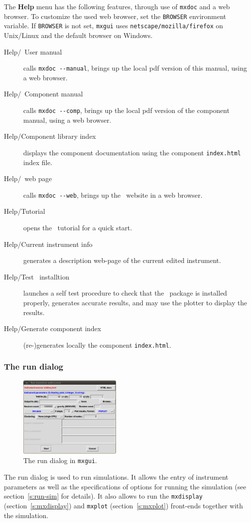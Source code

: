 \noindent The {\bfseries Help} menu has the following features, through use of
\verb+mxdoc+ and a web browser. To customize the used web browser, set
the \verb+BROWSER+ environment variable. If \verb+BROWSER+ is not set,
\verb+mxgui+ uses \verb+netscape/mozilla/firefox+ on Unix/Linux and the default browser on
Windows.
\begin{description}
\item[Help/\MCX\ User manual] calls \verb+mxdoc --manual+, brings up the local
  pdf version of this manual, using a web browser.
\item[Help/\MCX\ Component manual] calls \verb+mxdoc --comp+, brings up the local
  pdf version of the component manual, using a web browser.
\item[Help/Component library index] displays the component documentation using
  the component \verb+index.html+ index file.
\item[Help/\MCX\ web page] calls \verb+mxdoc --web+, brings up the \MCX\
  website in a web browser.
\item[Help/Tutorial] opens the \MCX\ tutorial for a quick start.
\item[Help/Current instrument info] generates a description web-page of the current edited instrument.
\item[Help/Test \MCX\ installtion] launches a self test procedure to check that the \MCX\ package is installed properly, generates accurate results, and may use the plotter to display the results.
\item[Help/Generate component index] (re-)generates locally the component \verb+index.html+.
\end{description}


\subsubsection{The run dialog}

\begin{figure}[htb!]
  \begin{center}
    \includegraphics[width=0.45\textwidth]{figures/mxgui-run.eps}
  \end{center}
\caption{The run dialog in \texttt{mxgui}.}
\label{fig:mxgui-run}
\end{figure}
%
The run dialog is used to run simulations. It allows the entry of
instrument parameters as well as the specifications of options for
running the simulation (see section~\ref{s:run-sim} for details). It
also allows to run the \verb+mxdisplay+ (section~\ref{s:mxdisplay}) and
\verb+mxplot+ (section~\ref{s:mxplot}) front-ends together with the
simulation.\index{Tools!mxplot}

